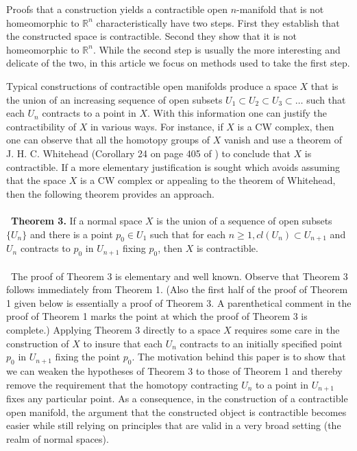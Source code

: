 \documentclass[12pt]{amsart}%
\theoremstyle{plain}
\numberwithin{equation}{section}
\begin{document}
\indent Proofs that a construction yields a contractible open $n$-manifold that is not homeomorphic to $\mathbb{R}^n$ characteristically have two steps.  First they establish that the constructed space is contractible.  Second they show that it is not homeomorphic to $\mathbb{R}^n$.  While the second step is usually the more interesting and delicate of the two, in this article we focus on methods used to take the first step. 

\indent Typical constructions of contractible open manifolds produce a space $X$ that is the union of an increasing sequence of open subsets $U_1 \subset U_2 \subset U_3 \subset \dots$ such that each $U_n$ contracts to a point in $X$.  With this information one can justify the contractibility of $X$ in various ways.  For instance, if $X$ is a CW complex, then one can observe that all the homotopy groups of $X$ vanish and use a theorem of J. H. C. Whitehead (Corollary 24 on page 405 of \cite{6}) to conclude that $X$ is contractible.  If a more elementary justification is sought which avoids assuming that the space $X$ is a CW complex or appealing to the theorem of Whitehead, then the following theorem provides an approach. 
\\\\\
\noindent \textbf{Theorem 3.} If a normal space $X$ is the union of a sequence of open subsets $\{U_n\}$ and there is a point $p_0 \in U_1$  such that for each $n \geq 1, cl(U_n) \subset U_{n+1}$ and $U_n$ contracts to $p_0$ in $U_{n+1}$ fixing $p_0$, then $X$ is contractible. 
\\\\\
\indent The proof of Theorem 3 is elementary and well known. Observe that Theorem 3 follows immediately from Theorem 1. (Also the first half of the proof of Theorem 1 given below is essentially a proof of Theorem 3. A parenthetical comment in the proof of Theorem 1 marks the point at which the proof of Theorem 3 is complete.) Applying Theorem 3 directly to a space $X$ requires some care in the construction of $X$ to insure that each $U_n$ contracts to an initially specified point $p_0$ in $U_{n+1}$ fixing the point $p_0$.  The motivation behind this paper is to show that we can weaken the hypotheses of Theorem 3 to those of Theorem 1 and thereby remove the requirement that the homotopy contracting $U_n$ to a point in $U_{n+1}$ fixes any particular point.  As a consequence, in the construction of a contractible open manifold, the argument that the constructed object is contractible becomes easier while still relying on principles that are valid in a very broad setting (the realm of normal spaces). 
\end{document}
